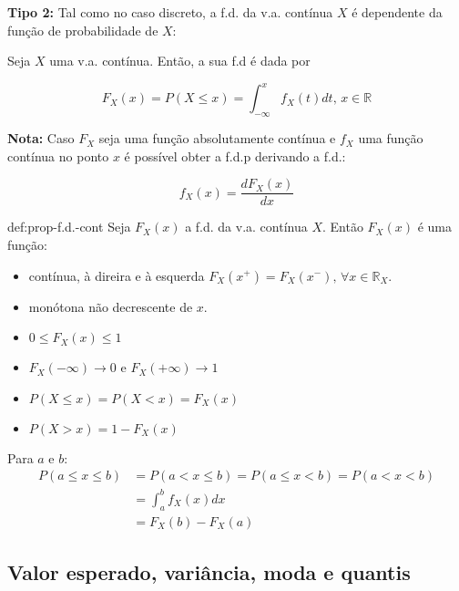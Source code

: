 \newpage
\noindent\textbf{Tipo 2:} Tal como no caso discreto, a f.d. da v.a. contínua $X$ é dependente da função de probabilidade de $X$:

\begin{mdframed}
Seja $X$ uma v.a. contínua. Então, a sua f.d é dada por

$$
    F_X(x) = P(X \leq x) = \int_{-\infty}^x f_X(t)dt,\, x \in \mathbb{R}
$$
\end{mdframed}

\noindent\textbf{Nota:} Caso $F_X$ seja uma função absolutamente contínua e $f_X$ uma função contínua no ponto $x$ é possível obter a f.d.p derivando a f.d.:

$$
    f_X(x) = \dfrac{d F_X(x)}{dx}
$$

\begin{theo}{def:prop-f.d.-cont}\label{def:prop-f.d.-cont}
\noindent Seja $F_X(x)$ a f.d. da v.a. contínua $X$. Então $F_X(x)$ é uma função:


\begin{itemize} 
    \item contínua, à direira e à esquerda $F_X(x^+) = F_X(x^-),\, \forall x \in\mathbb{R}_X$.
    \item monótona não decrescente de $x$.
    \item $0 \leq F_X(x) \leq 1$
    \item $F_X(-\infty) \to 0$ e $F_X(+\infty) \to 1$
    \item $P(X \leq x) = P(X < x) = F_X(x)$
    \item $P(X > x) = 1 - F_X(x)$
\end{itemize}
\noindent Para $a$ e $b$:
\begin{align*}
    P(a \leq x \leq b) &= P(a < x \leq b) = P(a \leq x < b) = P(a < x < b)\\
    &= \int_a^b f_X(x)dx\\
    &= F_X(b) - F_X(a)
\end{align*}
\end{theo}

\subsection[2.2 Valor esperado, variância, moda e quantis]{\hspace*{0.075 em}\raisebox{0.2 em}{$\pmb{\drsh}$} Valor esperado, variância, moda e quantis}

